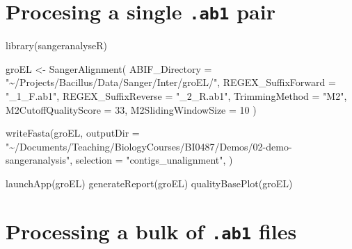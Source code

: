 \documentclass[
  letterpaper,
  DIV=11,
  numbers=noendperiod]{scrreprt}
\newenvironment{Shaded}{\begin{snugshade}}{\end{snugshade}}
\newcommand{\AttributeTok}[1]{\textcolor[rgb]{0.40,0.46,0.14}{#1}}
\newcommand{\DecValTok}[1]{\textcolor[rgb]{0.68,0.00,0.00}{#1}}
\newcommand{\FunctionTok}[1]{\textcolor[rgb]{0.28,0.35,0.67}{#1}}
\newcommand{\NormalTok}[1]{\textcolor[rgb]{0.00,0.46,0.62}{#1}}
\newcommand{\OtherTok}[1]{\textcolor[rgb]{0.00,0.46,0.62}{#1}}
\newcommand{\StringTok}[1]{\textcolor[rgb]{0.13,0.47,0.30}{#1}}
\begin{document}
\hypertarget{procesing-a-single-.ab1-pair}{%
\section*{\texorpdfstring{Procesing a single \texttt{.ab1}
pair}{Procesing a single .ab1 pair}}\label{procesing-a-single-.ab1-pair}}

\begin{Shaded}
\begin{Highlighting}[]
\FunctionTok{library}\NormalTok{(sangeranalyseR)}

\NormalTok{groEL }\OtherTok{\textless{}{-}} \FunctionTok{SangerAlignment}\NormalTok{(}
  \AttributeTok{ABIF\_Directory =} \StringTok{"\textasciitilde{}/Projects/Bacillus/Data/Sanger/Inter/groEL/"}\NormalTok{,}
  \AttributeTok{REGEX\_SuffixForward =} \StringTok{"\_1\_F.ab1"}\NormalTok{,}
  \AttributeTok{REGEX\_SuffixReverse =} \StringTok{"\_2\_R.ab1"}\NormalTok{,}
  \AttributeTok{TrimmingMethod =} \StringTok{"M2"}\NormalTok{,}
  \AttributeTok{M2CutoffQualityScore =} \DecValTok{33}\NormalTok{,}
  \AttributeTok{M2SlidingWindowSize =} \DecValTok{10}
\NormalTok{)}

\FunctionTok{writeFasta}\NormalTok{(groEL, }
           \AttributeTok{outputDir =} \StringTok{"\textasciitilde{}/Documents/Teaching/BiologyCourses/BI0487/Demos/02{-}demo{-}sangeranalysis"}\NormalTok{,}
           \AttributeTok{selection =} \StringTok{"contigs\_unalignment"}\NormalTok{,}
\NormalTok{           )}

\FunctionTok{launchApp}\NormalTok{(groEL)}
\FunctionTok{generateReport}\NormalTok{(groEL)}
\FunctionTok{qualityBasePlot}\NormalTok{(groEL)}
\end{Highlighting}
\end{Shaded}

\hypertarget{processing-a-bulk-of-.ab1-files}{%
\section*{\texorpdfstring{Processing a bulk of \texttt{.ab1}
files}{Processing a bulk of .ab1 files}}\label{processing-a-bulk-of-.ab1-files}}
\end{document}
